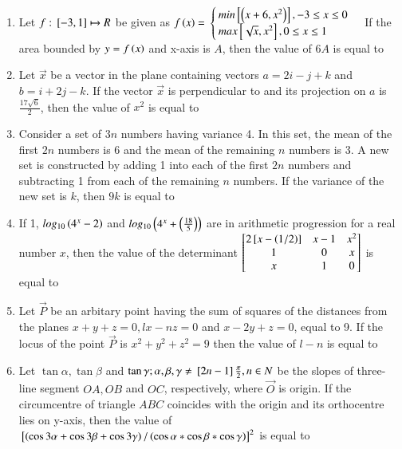 \documentclass[journal]{IEEEtran}
\begin{document}
\begin{enumerate}
\item Let $f:{}\left[-3,1\right]\mapsto R$ be given as $f\left(x\right)=$ $\begin{cases}
min{}\left[\left(x+6,x^2\right)\right], -3\leq x \leq 0\\
max{}\left[\sqrt{x}, x^2\right], 0\leq x \leq 1
\end{cases}$
If the area bounded by $y=f\left(x\right)$ and x-axis is $A$, then the value of $6A$ is equal to
\item Let $\vec{x}$ be a vector in the plane containing vectors $a=2i-j+k$ and $b=i+2j-k$. If the vector $\vec{x}$ is perpendicular to  and its projection on $a$ is $\frac{17\sqrt{6}}{2}$, then the value of $x^2$ is equal to 
\item Consider a set of $3n$ numbers having variance 4. In this set, the mean of the first $2n$ numbers is 6 and the mean of the remaining $n$ numbers is 3. A new set is constructed by adding 1 into each of the first $2n$ numbers and subtracting 1 from each of the remaining $n$ numbers. If the variance of the new set is $k$, then $9k$ is equal to 
\item If 1, $log_{10}\left(4^x-2\right)$ and $log_{10}\left(4^x+\left(\frac{18}{5}\right)\right)$ are in arithmetic progression for a real number $x$, then the value of the determinant $\begin{bmatrix}2{}\left[x-\left(1/2\right)\right]& x-1 & x^2 \\ 1 & 0 & x \\ x & 1 & 0\end{bmatrix}$ is equal to 
\item Let $\vec{P}$ be an arbitary point having the sum of squares of the distances from the planes $x+y+z=0, lx-nz=0$ and $x-2y+z=0$, equal to 9. If the locus of the point $\vec{P}$ is $x^2+y^2+z^2=9$ then the value of $l-n$ is equal to 
\item Let $\tan \alpha, \tan \beta$ and $\tan \gamma;\alpha,\beta,\gamma\neq{}\left[2n-1\right]\frac{\pi}{2},n\in N$ be the slopes of three-line segment $OA,OB$ and $OC$, respectively, where $\vec{O}$ is origin. If the circumcentre of triangle $ABC$ coincides with the origin and its orthocentre lies on y-axis, then the value of ${}\left[\left(\cos 3\alpha +\cos 3\beta +\cos 3\gamma\right)/\left(\cos \alpha *\cos \beta *\cos \gamma\right)\right]^2$ is equal to 
\end{enumerate}
\end{document}
